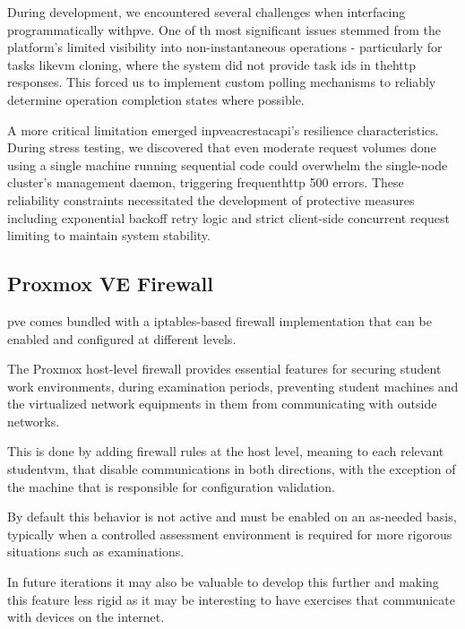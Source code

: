         During development, we encountered several challenges when interfacing programmatically with\ac{pve}. One of th most significant 
        issues stemmed from the platform's limited visibility into non-instantaneous operations - particularly for tasks like\ac{vm} cloning, 
        where the system did not provide task ids in the\ac{http} responses. This forced us to implement custom polling mechanisms to reliably 
        determine operation completion states where possible.

        A more critical limitation emerged in\ac{pve}ac{rest}ac{api}'s resilience characteristics. During stress testing, we discovered that 
        even moderate request volumes done using a single machine running sequential code could overwhelm the single-node cluster's management 
        daemon, triggering frequent\ac{http} 500 errors. These reliability constraints necessitated the development of protective measures 
        including exponential backoff retry logic and strict client-side concurrent request limiting to maintain system stability.

    \subsection{Proxmox VE Firewall}

        \ac{pve} comes bundled with a iptables-based firewall implementation that can be enabled and configured at different levels.

        The Proxmox host-level firewall provides essential features for securing student work environments, during examination 
        periods, preventing student machines and the virtualized network equipments in them from communicating with outside networks.

        This is done by adding firewall rules at the host level, meaning to each relevant student\ac{vm}, that disable communications
        in both directions, with the exception of the machine that is responsible for configuration validation.

        By default this behavior is not active and must be enabled on an as-needed basis, typically when a controlled assessment 
        environment is required for more rigorous situations such as examinations.

        In future iterations it may also be valuable to develop this further and making this feature less rigid as it may be interesting 
        to have exercises that communicate with devices on the internet.
    
